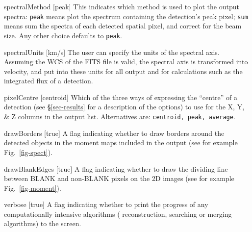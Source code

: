\begin{Lentry}
\item[{spectralMethod [peak]}] This indicates which method is used
  to plot the output spectra: \texttt{peak} means plot the spectrum
  containing the detection's peak pixel; \texttt{sum} means sum the
  spectra of each detected spatial pixel, and correct for the beam
  size. Any other choice defaults to \texttt{peak}.
\item[{spectralUnits [km/s]}] The user can specify the units of
  the spectral axis. Assuming the WCS of the FITS file is valid, the
  spectral axis is transformed into velocity, and put into these units
  for all output and for calculations such as the integrated flux of a
  detection.
\item[{pixelCentre [centroid]}] Which of the three ways of
  expressing the ``centre'' of a detection (see \S\ref{sec-results}
  for a description of the options) to use for the X, Y, \& Z
  columns in the output list. Alternatives are: \texttt{centroid, peak,
  average}. 
\item[{drawBorders [true]}] A flag indicating whether to draw
  borders around the detected objects in the moment maps included in
  the output (see for example Fig.~\ref{fig-spect}).
\item[{drawBlankEdges [true]}] A flag indicating whether to
  draw the dividing line between BLANK and non-BLANK pixels on the
  2D images (see for example Fig.~\ref{fig-moment}).
\item[{verbose [true]}] A flag indicating whether to print the
  progress of any computationally intensive algorithms (\eg
  reconstruction, searching or merging algorithms) to the screen.
\end{Lentry}

